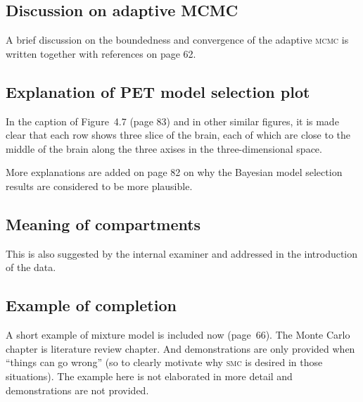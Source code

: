 \documentclass[11pt, fontset=Scala]{marticle}
\begin{document}

\subsection{Discussion on adaptive MCMC} %
\label{sub:discussion_on_adaptive_mcmc}

A brief discussion on the boundedness and convergence of the adaptive \textsc{mcmc} is written together with references on page 62.


\subsection{Explanation of PET model selection plot} %
\label{sub:explanation_of_pet_model_selection_plot}

In the caption of Figure~4.7 (page 83) and in other similar figures, it is made clear that each row shows three slice of the brain, each of which are close to the middle of the brain along the three axises in the three-dimensional space.

More explanations are added on page 82 on why the Bayesian model selection results are considered to be more plausible.


\subsection{Meaning of compartments} %
\label{sub:meaning_of_compartments}

This is also suggested by the internal examiner and addressed in the introduction of the data.


\subsection{Example of completion} %
\label{sub:example_of_completion}

A short example of mixture model is included now (page~66). The Monte Carlo chapter is literature review chapter. And demonstrations are only provided when ``things can go wrong'' (so to clearly motivate why \textsc{smc} is desired in those situations). The example here is not elaborated in more detail and demonstrations are not provided.
\end{document}
